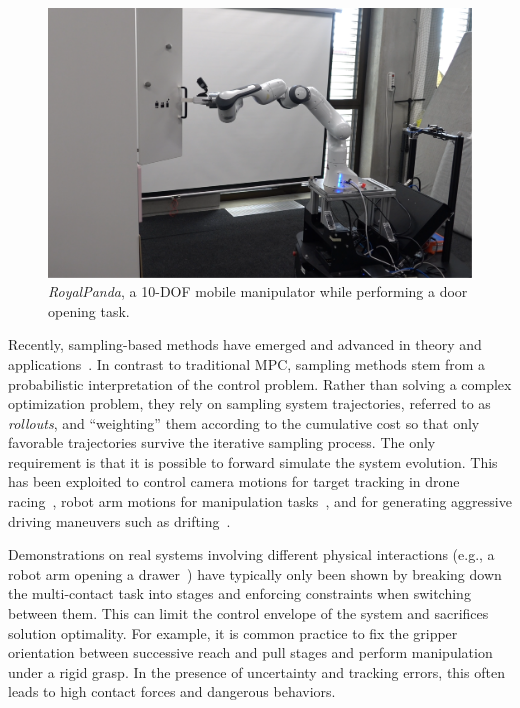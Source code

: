 \begin{figure}[t]
\centering
\includegraphics[trim={0 0 0 100},clip,width=0.9\columnwidth]{framework_manipulation/figures/hardware/system_figure.pdf}
\caption{\textit{RoyalPanda}, a 10-DOF mobile manipulator while performing a door opening task.} \label{fig:royal_panda}
\end{figure}

Recently, sampling-based methods have emerged and advanced in theory and applications~\cite{lee_aggressive_2020,abraham_model-based_2020,williams_information_nodate,williams_information_2017,rajamaki_augmenting_2017}. 
In contrast to traditional MPC, sampling methods stem from a probabilistic interpretation of the control problem. 
Rather than solving a complex optimization problem, they rely on sampling system trajectories, referred to as \textit{rollouts}, and ``weighting'' them according to the cumulative cost so that only favorable trajectories survive the iterative sampling process. The only requirement is that it is possible to forward simulate the system evolution. This has been exploited to control camera motions for target tracking in drone racing~\cite{lee_aggressive_2020}, robot arm motions for manipulation tasks~\cite{abraham_model-based_2020}, and for generating aggressive driving maneuvers such as drifting~\cite{williams_information_nodate, williams_information_2017}. 

Demonstrations on real systems involving different physical interactions (e.g., a robot arm opening a drawer~\cite{abraham_model-based_2020}) have typically only been shown by breaking down the multi-contact task into stages and enforcing constraints when switching between them. 
This can limit the control envelope of the system and sacrifices solution optimality. For example, it is common practice to fix the gripper orientation between successive reach and pull stages and perform manipulation under a rigid grasp. In the presence of uncertainty and tracking errors, this often leads to high contact forces and dangerous behaviors.

